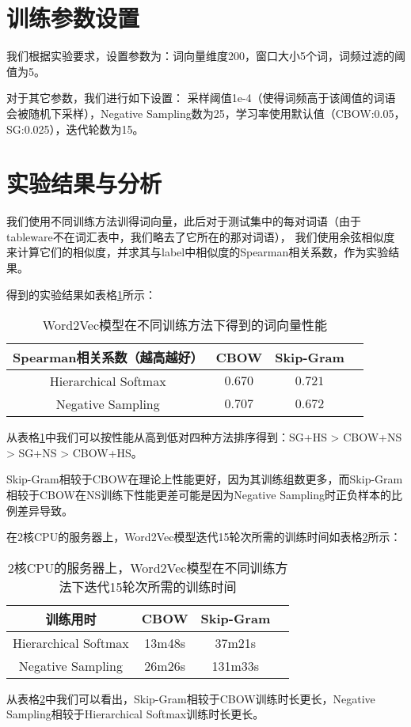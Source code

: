 \documentclass{article}
\begin{document}
\section{训练参数设置}
我们根据实验要求，设置参数为：词向量维度200，窗口大小5个词，词频过滤的阈值为5。

对于其它参数，我们进行如下设置：
采样阈值1e-4（使得词频高于该阈值的词语会被随机下采样），Negative Sampling数为25，学习率使用默认值（CBOW:0.05，SG:0.025），迭代轮数为15。



\section{实验结果与分析}


我们使用不同训练方法训得词向量，此后对于测试集中的每对词语（由于tableware不在词汇表中，我们略去了它所在的那对词语），
我们使用余弦相似度来计算它们的相似度，并求其与label中相似度的Spearman相关系数，作为实验结果。

得到的实验结果如表格\ref{tab:results}所示：
\begin{table}[htbp]
  \caption{Word2Vec模型在不同训练方法下得到的词向量性能}
  \label{tab:results}
  \vspace{5pt}
  \centering
  \begin{tabular}{cccc}
    \toprule
    Spearman相关系数（越高越好） & CBOW    & Skip-Gram \\
    \midrule
    Hierarchical Softmax         & $0.670$ & $0.721$   \\
    \midrule
    Negative Sampling            & $0.707$ & $0.672$   \\
    \bottomrule
  \end{tabular}
\end{table}

从表格\ref{tab:results}中我们可以按性能从高到低对四种方法排序得到：SG+HS > CBOW+NS > SG+NS > CBOW+HS。

Skip-Gram相较于CBOW在理论上性能更好，因为其训练组数更多，而Skip-Gram相较于CBOW在NS训练下性能更差可能是因为Negative Sampling时正负样本的比例差异导致。


在2核CPU的服务器上，Word2Vec模型迭代15轮次所需的训练时间如表格\ref{tab:time}所示：
\begin{table}[htbp]
  \caption{2核CPU的服务器上，Word2Vec模型在不同训练方法下迭代15轮次所需的训练时间}
  \label{tab:time}
  \vspace{5pt}
  \centering
  \begin{tabular}{cccc}
    \toprule
    训练用时             & CBOW   & Skip-Gram \\
    \midrule
    Hierarchical Softmax & 13m48s & 37m21s    \\
    \midrule
    Negative Sampling    & 26m26s & 131m33s   \\
    \bottomrule
  \end{tabular}
\end{table}

从表格\ref{tab:time}中我们可以看出，Skip-Gram相较于CBOW训练时长更长，Negative Sampling相较于Hierarchical Softmax训练时长更长。
\end{document}
